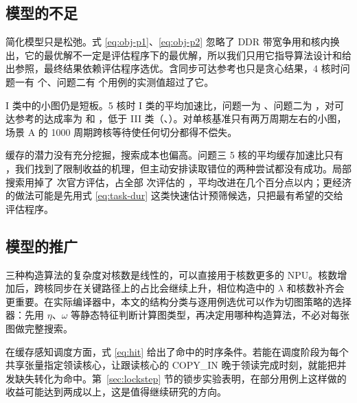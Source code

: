\subsection{模型的不足}

简化模型只是松弛。式 \eqref{eq:obj-p1}、\eqref{eq:obj-p2} 忽略了 DDR 带宽争用和核内换出，它的最优解不一定是评估程序下的最优解，所以我们只用它指导算法设计和给出参照，最终结果依赖评估程序选优。含同步可达参考也只是贪心结果，4 核时问题一有  个、问题二有  个用例的实测值超过了它。

I 类中的小图仍是短板。5 核时 I 类的平均加速比，问题一为 、问题二为 ，对可达参考的达成率为  和 ，低于 III 类（、）。对单核基准只有两万周期左右的小图，场景 A 的 1000 周期跨核等待使任何切分都得不偿失。

缓存的潜力没有充分挖掘，搜索成本也偏高。问题三 5 核的平均缓存加速比只有 ，我们找到了限制收益的机理，但主动安排读取错位的两种尝试都没有成功。局部搜索用掉了  次官方评估，占全部  次评估的 ，平均改进在几个百分点以内；更经济的做法可能是先用式 \eqref{eq:task-dur} 这类快速估计预筛候选，只把最有希望的交给评估程序。

\subsection{模型的推广}

三种构造算法的复杂度对核数是线性的，可以直接用于核数更多的 NPU。核数增加后，跨核同步在关键路径上的占比会继续上升，相位构造中的 $\lambda$ 和核数补齐会更重要。在实际编译器中，本文的结构分类与逐用例选优可以作为切图策略的选择器：先用 $\eta$、$\omega$ 等静态特征判断计算图类型，再决定用哪种构造算法，不必对每张图做完整搜索。

在缓存感知调度方面，式 \eqref{eq:hit} 给出了命中的时序条件。若能在调度阶段为每个共享张量指定领读核心，让跟读核心的 COPY\_IN 晚于领读完成时刻，就能把并发缺失转化为命中。第~\ref{sec:lockstep} 节的锁步实验表明，在部分用例上这样做的收益可能达到两成以上，这是值得继续研究的方向。
